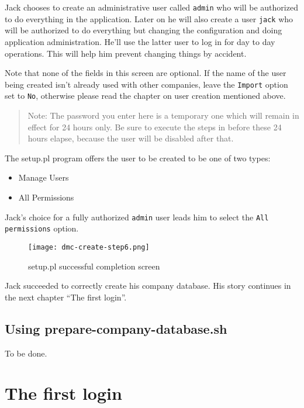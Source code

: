 Jack chooses to create an administrative user called \texttt{admin} who will be authorized
to do everything in the application. Later on he will also create a user \texttt{jack}
who will be authorized to do everything but changing the configuration and doing application administration.
He'll use the latter user to log in for day to day operations. This will help him prevent
changing things by accident.

Note that none of the fields in this screen are optional. If the name of the user being created
isn't already used with other companies, leave the \texttt{Import} option set to \texttt{No},
otherwise please read the chapter on user creation mentioned above.

\begin{quotation}
Note: The password you enter here is a temporary one which will remain in effect for 24
hours only. Be sure to execute the steps in  before
these 24 hours elapse, because the user will be disabled after that.
\end{quotation}

The setup.pl program offers the user to be created to be one of two types:

\begin{itemize}
\item Manage Users
\item All Permissions
\end{itemize}

Jack's choice for a fully authorized \texttt{admin} user leads him to select the
\texttt{All permissions} option.

\begin{figure}[h]
\centering
\texttt{[image: dmc-create-step6.png]}
\caption{setup.pl successful completion screen}
\label{fig:setup-step6}
\end{figure}

Jack succeeded to correctly create his company database. His story continues in
the next chapter ``The first login''.

\section{Using prepare-company-database.sh}

To be done.


\chapter{The first login}
\label{cha:the-first-login}

